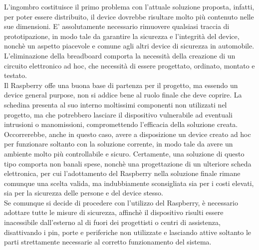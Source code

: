 \documentclass[12pt]{article}
\begin{document}
L'ingombro costituisce il primo problema con l'attuale soluzione proposta, infatti, per poter essere distribuito, il device dovrebbe risultare molto più contenuto nelle sue dimensioni. E' assolutamente necessario rimuovere qualsiasi traccia di prototipazione, in modo tale da garantire la sicurezza e l'integrità del device, nonchè un aspetto piacevole e comune agli altri device di sicurezza in automobile. L'eliminazione della breadboard comporta la necessità della creazione di un circuito elettronico ad hoc, che necessità di essere progettato, ordinato, montato e testato.\\

Il Raspberry offe una buona base di partenza per il progetto, ma essendo un device general purpose, non si addice bene al ruolo finale che deve coprire. La schedina presenta al suo interno moltissimi componenti non utilizzati nel progetto, ma che potrebbero lasciare il dispositivo vulnerabile ad eventuali intrusioni o manomissioni, compromettendo l'efficacia della soluzione creata. Occorrerebbe, anche in questo caso, avere a disposizione un device creato ad hoc per funzionare soltanto con la soluzione corrente, in modo tale da avere un ambiente molto più controllabile e sicuro. Certamente, una soluzione di questo tipo comporta non banali spese, nonchè una progettazione di un ulteriore scheda elettronica, per cui l'adottamento del Raspberry nella soluzione finale rimane comunque una scelta valida, ma indubbiamente sconsigliata sia per i costi elevati, sia per la sicurezza delle persone e del device stesso.\\
Se comunque si decide di procedere con l'utilizzo del Raspberry, è necessario adottare tutte le misure di sicurezza, affinchè il dispositivo risulti essere inacessibile dall'esterno al di fuori dei progettisti o centri di assistenza, disattivando i pin, porte e periferiche non utilizzate e lasciando attive soltanto le parti strettamente necessarie al corretto funzionamento del sistema.\\
\end{document}

